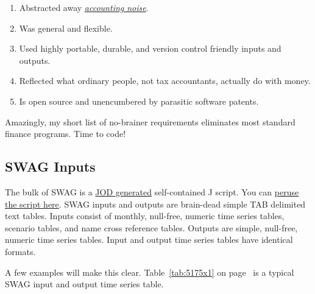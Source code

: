 \begin{enumerate}
\def\labelenumi{\arabic{enumi}.}
\item
  Abstracted away \href{http://www.investopedia.com/terms/a/accountingnoise.asp}{\emph{accounting noise}}.
\item
  Was general and flexible.
\item
  Used highly portable, durable, and version control friendly inputs and
  outputs.
\item
  Reflected what ordinary people, not tax accountants, actually do with
  money.
\item
  Is open source and unencumbered by parasitic software patents.
\end{enumerate}

Amazingly, my short list of no-brainer requirements eliminates most
standard finance programs. Time to code!

\subsection*{SWAG Inputs}%

The bulk of SWAG is a
\href{http://code.jsoftware.com/wiki/Addons/general/jod}{JOD generated}
self-contained J script. You can
\href{https://github.com/bakerjd99/jacks/blob/master/swag/scripts/Swag.ijs}{peruse
the script here}. SWAG inputs and outputs are brain-dead simple TAB
delimited text tables. Inputs consist of monthly, null-free, numeric
time series tables, scenario tables, and name cross reference tables.
Outputs are simple, null-free, numeric time series tables. Input and
output time series tables have identical formats.

A few examples will make this clear. Table~\ref{tab:5175x1} on page~\pageref{tab:5175x1} is a typical SWAG
input and output time series table.


